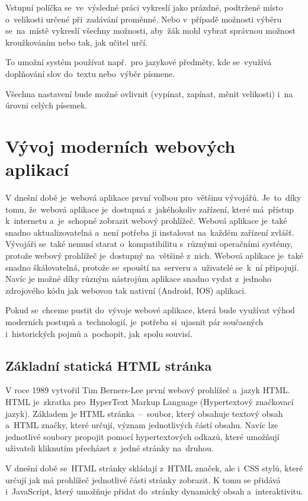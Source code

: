 \documentclass[14pt,a4paper]{article}
\begin{document}
        Vstupní políčka se~ve~výsledné práci vykreslí jako prázdné, podtržené místo o~velikosti určené při~zadávání proměnné.
        Nebo v~případě možnosti výběru se~na~místě vykreslí všechny možnosti, aby~žák mohl vybrat správnou možnost kroužkováním nebo tak, jak učitel určí.
        
        To umožní systém používat např.~pro jazykové předměty, kde se~využívá doplňování slov do~textu nebo~výběr písmene.

        Všechna nastavení bude možné ovlivnit (vypínat, zapínat, měnit velikosti) i~na úrovni celých písemek.

    \section{Vývoj moderních webových aplikací}
    V dnešní době je~webová aplikace první volbou pro~většinu vývojářů. Je~to~díky tomu, že~webová aplikace je~dostupná z~jakéhokoliv zařízení,
    které má~přístup k~internetu a~je~schopné zobrazit webový prohlížeč. Webová aplikace je~také snadno aktualizovatelná a~není potřeba ji
    instalovat na~každém zařízení zvlášť. Vývojáři se~také nemusí starat o~kompatibilitu s~různými operačními systémy, protože webový prohlížeč
    je~dostupný na~většině z~nich. Webová aplikace je~také snadno škálovatelná, protože se~spouští na~serveru a~uživatelé se~k~ní připojují.
    Navíc je možné díky různým nástrojům aplikace snadno vydat z~jednoho zdrojového kódu jak webovou tak nativní (Android, IOS) aplikaci.

    Pokud se~chceme pustit do~vývoje webové aplikace, která bude využívat výhod moderních postupů a~technologií, je~potřeba
    si~ujasnit pár současných i~historických pojmů a~pochopit, jak~spolu souvisí.

        \subsection{Základní statická HTML stránka}
        V roce 1989 vytvořil Tim Berners-Lee první webový prohlížeč a~jazyk HTML. HTML je~zkratka pro~HyperText Markup Language (Hypertextový značkovací jazyk).
        Základem je HTML stránka~--~soubor, který obsahuje textový obsah a~HTML značky, které určují, význam jednotlivých částí obsahu.
        Navíc lze jednotlivé soubory propojit pomocí hypertextových odkazů, které umožňují uživateli kliknutím přecházet z~jedné stránky na~druhou.

        V dnešní době se~HTML stránky skládají z~HTML značek, ale i~CSS stylů, které určují jak má prohlížeč jednotlivé části stránky zobrazit.
        K tomu se přidává i~JavaScript, který umožňuje přidat do~stránky dynamický obsah a~interaktivitu. \parencite{berners:1989:proposal}
\end{document}
